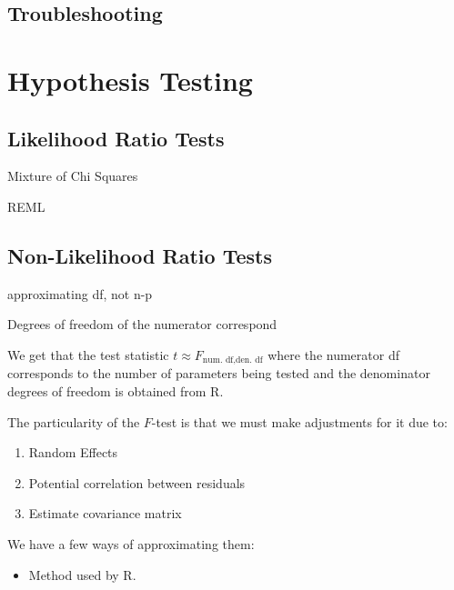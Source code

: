\documentclass[english]{article}
\begin{document}
\begin{multicols*}{2}
\subsection{Troubleshooting}



\columnbreak
\section{Hypothesis Testing}\label{sec:BHypTesting}

\subsection{Likelihood Ratio Tests}\label{subsec:LRT}
Mixture of Chi Squares

REML


\subsection{Non-Likelihood Ratio Tests}
\begin{definitionNOHFILL}[$t$-test]

approximating df, not n-p
\end{definitionNOHFILL}


\begin{definitionNOHFILL}[$F$-test]
\begin{rappel_enhanced}[Context]
Degrees of freedom of the numerator correspond
\end{rappel_enhanced}

We get that the test statistic $t \approx F_{\text{num. df}, \text{den. df}}$ where the numerator df corresponds to the number of parameters being tested and the denominator degrees of freedom is obtained from R. 

\bigskip

The particularity of the $F$-test is that we must make adjustments for it due to:
\begin{enumerate}
	\item	Random Effects
	\item	Potential correlation between residuals
	\item	Estimate covariance matrix
\end{enumerate}

We have a few ways of approximating them:

\begin{definitionNOHFILLpropos}[Scatterwhite]

\begin{itemize}
	\item	Method used by R.
\end{itemize}
\end{definitionNOHFILLpropos}


\end{definitionNOHFILL}
\end{multicols*}
\end{document}
